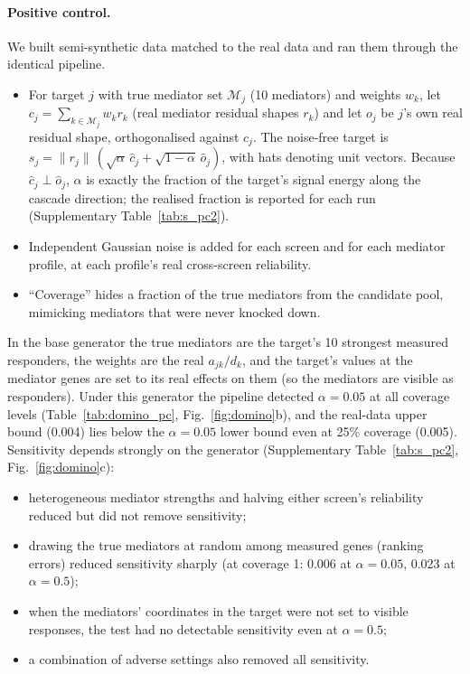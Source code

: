 \documentclass[10pt]{article}
\begin{document}
\paragraph{Positive control.} We built semi-synthetic data matched to the real data and ran them through the identical pipeline.
\begin{itemize}
\item For target $j$ with true mediator set $\mathcal{M}_j$ (10 mediators) and weights $w_k$, let $c_j=\sum_{k\in\mathcal{M}_j} w_k r_k$ (real mediator residual shapes $r_k$) and let $o_j$ be $j$'s own real residual shape, orthogonalised against $c_j$. The noise-free target is $s_j=\|r_j\|\,(\sqrt{\alpha}\,\hat c_j+\sqrt{1-\alpha}\,\hat o_j)$, with hats denoting unit vectors. Because $\hat c_j\perp\hat o_j$, $\alpha$ is exactly the fraction of the target's signal energy along the cascade direction; the realised fraction is reported for each run (Supplementary Table~\ref{tab:s_pc2}).
\item Independent Gaussian noise is added for each screen and for each mediator profile, at each profile's real cross-screen reliability.
\item ``Coverage'' hides a fraction of the true mediators from the candidate pool, mimicking mediators that were never knocked down.
\end{itemize}
In the base generator the true mediators are the target's 10 strongest measured responders, the weights are the real $a_{jk}/d_k$, and the target's values at the mediator genes are set to its real effects on them (so the mediators are visible as responders). Under this generator the pipeline detected $\alpha=0.05$ at all coverage levels (Table~\ref{tab:domino_pc}, Fig.~\ref{fig:domino}b), and the real-data upper bound (0.004) lies below the $\alpha=0.05$ lower bound even at 25\% coverage (0.005).
Sensitivity depends strongly on the generator (Supplementary Table~\ref{tab:s_pc2}, Fig.~\ref{fig:domino}c):
\begin{itemize}
\item heterogeneous mediator strengths and halving either screen's reliability reduced but did not remove sensitivity;
\item drawing the true mediators at random among measured genes (ranking errors) reduced sensitivity sharply (at coverage 1: 0.006 at $\alpha=0.05$, 0.023 at $\alpha=0.5$);
\item when the mediators' coordinates in the target were not set to visible responses, the test had no detectable sensitivity even at $\alpha=0.5$;
\item a combination of adverse settings also removed all sensitivity.
\end{itemize}
\end{document}

